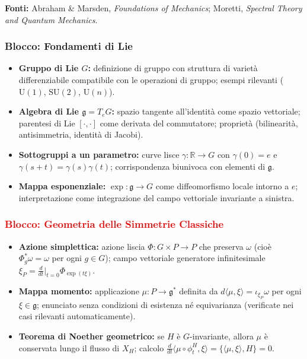 \documentclass[12pt, a4paper]{article}
\newcommand{\fonti}[1]{%
	\begin{fontebox}
		\textcolor{fontecolor}{\footnotesize\textbf{Fonti:} #1}
	\end{fontebox}%
}
\begin{document}
	\fonti{Abraham \& Marsden, \textit{Foundations of Mechanics}; Moretti, \textit{Spectral Theory and Quantum Mechanics}.}
	
	\subsubsection{Blocco: Fondamenti di Lie}
	\begin{itemize}
		\item \textbf{Gruppo di Lie $G$:} definizione di gruppo con struttura di varietà differenziabile compatibile con le operazioni di gruppo; esempi rilevanti ($\text{U}(1)$, $\text{SU}(2)$, $\text{U}(n)$).
		\item \textbf{Algebra di Lie $\mathfrak{g} = T_eG$:} spazio tangente all'identità come spazio vettoriale; parentesi di Lie $[\cdot,\cdot]$ come derivata del commutatore; proprietà (bilinearità, antisimmetria, identità di Jacobi).
		\item \textbf{Sottogruppi a un parametro:} curve lisce $\gamma: \mathbb{R} \to G$ con $\gamma(0)=e$ e $\gamma(s+t)=\gamma(s)\gamma(t)$; corrispondenza biunivoca con elementi di $\mathfrak{g}$.
		\item \textbf{Mappa esponenziale:} $\exp: \mathfrak{g} \to G$ come diffeomorfismo locale intorno a $e$; interpretazione come integrazione del campo vettoriale invariante a sinistra.
	\end{itemize}
	
	\subsubsection{\textcolor{red}{Blocco: Geometria delle Simmetrie Classiche}}
	\begin{itemize}
		\item \textbf{Azione simplettica:} azione liscia $\Phi: G \times P \to P$ che preserva $\omega$ (cioè $\Phi_g^*\omega = \omega$ per ogni $g \in G$); campo vettoriale generatore infinitesimale $\xi_P = \frac{d}{dt}\big|_{t=0}\Phi_{\exp(t\xi)}$.
		\item \textbf{Mappa momento:} applicazione $\mu: P \to \mathfrak{g}^*$ definita da $d\langle\mu, \xi\rangle = \iota_{\xi_P}\omega$ per ogni $\xi \in \mathfrak{g}$; enunciato senza condizioni di esistenza né equivarianza (verificate nei casi rilevanti automaticamente).
		\item \textbf{Teorema di Noether geometrico:} se $H$ è $G$-invariante, allora $\mu$ è conservata lungo il flusso di $X_H$; calcolo $\frac{d}{dt}\langle\mu \circ \phi_t^H, \xi\rangle = \{\langle\mu,\xi\rangle, H\} = 0$. 
	\end{itemize}
	
\end{document}
